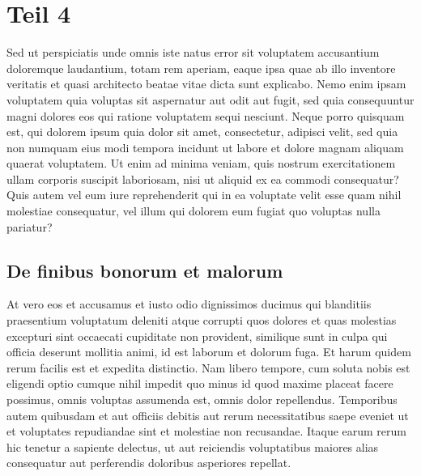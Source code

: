 %
%
%
%
\section{Teil 4
\label{elastomechanik:section:teil4}}
Sed ut perspiciatis unde omnis iste natus error sit voluptatem
accusantium doloremque laudantium, totam rem aperiam, eaque ipsa
quae ab illo inventore veritatis et quasi architecto beatae vitae
dicta sunt explicabo. Nemo enim ipsam voluptatem quia voluptas sit
aspernatur aut odit aut fugit, sed quia consequuntur magni dolores
eos qui ratione voluptatem sequi nesciunt. Neque porro quisquam
est, qui dolorem ipsum quia dolor sit amet, consectetur, adipisci
velit, sed quia non numquam eius modi tempora incidunt ut labore
et dolore magnam aliquam quaerat voluptatem. Ut enim ad minima
veniam, quis nostrum exercitationem ullam corporis suscipit laboriosam,
nisi ut aliquid ex ea commodi consequatur? Quis autem vel eum iure
reprehenderit qui in ea voluptate velit esse quam nihil molestiae
consequatur, vel illum qui dolorem eum fugiat quo voluptas nulla
pariatur?

\subsection{De finibus bonorum et malorum
\label{elastomechanik:subsection:malorum}}
At vero eos et accusamus et iusto odio dignissimos ducimus qui
blanditiis praesentium voluptatum deleniti atque corrupti quos
dolores et quas molestias excepturi sint occaecati cupiditate non
provident, similique sunt in culpa qui officia deserunt mollitia
animi, id est laborum et dolorum fuga. Et harum quidem rerum facilis
est et expedita distinctio. Nam libero tempore, cum soluta nobis
est eligendi optio cumque nihil impedit quo minus id quod maxime
placeat facere possimus, omnis voluptas assumenda est, omnis dolor
repellendus. Temporibus autem quibusdam et aut officiis debitis aut
rerum necessitatibus saepe eveniet ut et voluptates repudiandae
sint et molestiae non recusandae. Itaque earum rerum hic tenetur a
sapiente delectus, ut aut reiciendis voluptatibus maiores alias
consequatur aut perferendis doloribus asperiores repellat.


